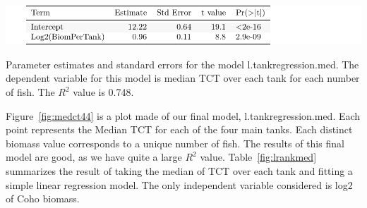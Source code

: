 \begin{table}[H]
\includegraphics{Chapter3Images/tankregressionMED.pdf}
\caption{\hspace{1mm}Parameter estimates and standard errors for the model l.tankregression.med. The dependent variable for this model is median TCT over each tank for each number of fish. The $R^{2}$ value is 0.748. }
\label{fig:lrankmed}
\end{table}

 Figure~\ref{fig:medct44} is a plot made of our final model, l.tankregression.med. Each point represents the Median TCT for each of the four main tanks. Each distinct biomass value corresponds to a unique number of fish.  The results of this final model are good, as we have quite a large $R^{2}$ value. Table~\ref{fig:lrankmed} summarizes the result of taking the median of TCT over each tank and fitting a simple linear regression model. The only independent variable considered is log2 of Coho biomass. 




